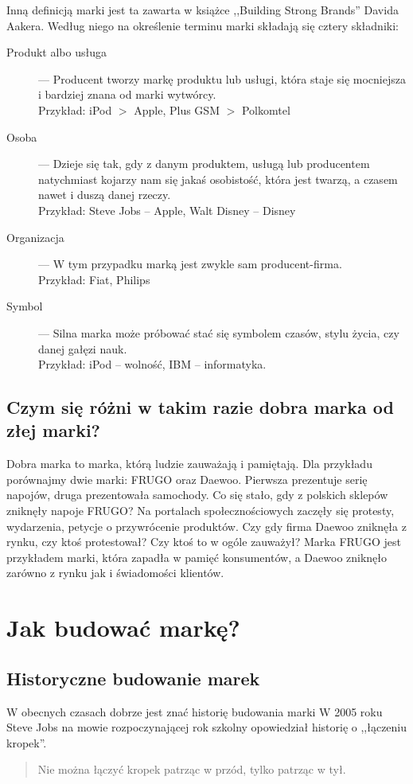 \documentclass [a4paper, 11pt]{article}
\begin{document}
Inną definicją marki jest ta zawarta w książce ,,Building Strong Brands''\cite[s.~68]{aaker} Davida Aakera. Według niego na określenie terminu marki składają się cztery składniki:
\begin{description}
	\item[Produkt albo usługa] --- Producent tworzy markę produktu lub usługi, która staje się mocniejsza i bardziej znana od marki wytwórcy.\\
	Przykład: iPod $>$ Apple, Plus GSM $>$ Polkomtel
	\item[Osoba] --- Dzieje się tak, gdy z danym produktem, usługą lub producentem natychmiast kojarzy nam się jakaś osobistość, która jest twarzą, a czasem nawet i duszą danej rzeczy.\\
	Przykład: Steve Jobs -- Apple, Walt Disney -- Disney
	\item[Organizacja] --- W tym przypadku marką jest zwykle sam producent-firma.\\
	Przykład: Fiat, Philips
	\item[Symbol] --- Silna marka może próbować stać się symbolem czasów, stylu życia, czy danej gałęzi nauk.\\
	Przykład: iPod -- wolność, IBM -- informatyka.
\end{description}

\subsection{Czym się różni w takim razie dobra marka od złej marki?}
Dobra marka to marka, którą ludzie zauważają i pamiętają. \cite{pogorzelski} Dla przykładu porównajmy dwie marki: FRUGO oraz Daewoo. Pierwsza prezentuje serię napojów, druga prezentowała samochody. Co się stało, gdy z polskich sklepów zniknęły napoje FRUGO? Na portalach społecznościowych zaczęły się protesty, wydarzenia, petycje o przywrócenie produktów. Czy gdy firma Daewoo zniknęła z rynku, czy ktoś protestował? Czy ktoś to w ogóle zauważył? Marka FRUGO jest przykładem marki, która zapadła w pamięć konsumentów, a Daewoo zniknęło zarówno z rynku jak i świadomości klientów.

\section{Jak budować markę?}
\subsection{Historyczne budowanie marek}
W obecnych czasach dobrze jest znać historię budowania marki W 2005 roku Steve Jobs na mowie rozpoczynającej rok szkolny opowiedział historię o ,,łączeniu kropek''.
\begin{quote}
Nie można łączyć kropek patrząc w przód, tylko patrząc w tył. \begin{flushright}\cite{jobs}\end{flushright}
\end{quote}
\end{document}
